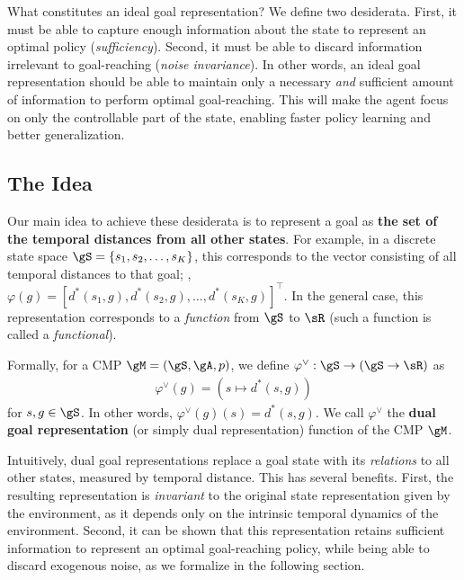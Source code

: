 \documentclass[final]{article} %
\theoremstyle{plain}
\theoremstyle{definition}
\theoremstyle{remark}
\renewcommand{\phi}{\varphi}
\newcommand{\cutsubsectionup}{\vspace{-2pt}}
\newcommand{\cutsubsectiondown}{\vspace{-3pt}}
\begin{document}
What constitutes an ideal goal representation?
We define two desiderata.
First, it must be able to capture enough information about the state to represent an optimal policy (\emph{sufficiency}).
Second, it must be able to discard information irrelevant to goal-reaching (\emph{noise invariance}).
In other words,
an ideal goal representation should be able to maintain
only a necessary \emph{and} sufficient amount of information to perform optimal goal-reaching.
This will make the agent focus on only the controllable part of the state,
enabling faster policy learning and better generalization.

%

\cutsubsectionup
\subsection{The Idea}
\cutsubsectiondown

Our main idea to achieve these desiderata is
to represent a goal as \textbf{the set of the temporal distances from all other states}.
For example, in a discrete state space $\gS = \{s_1, s_2, \ldots, s_K\}$, this corresponds to
the vector consisting of all temporal distances to that goal; \ie, $\phi(g) = [d^*(s_1, g), d^*(s_2, g), \ldots, d^*(s_K, g)]^\top$.
In the general case, this representation corresponds to a \emph{function} from $\gS$ to $\sR$
(such a function is called a \emph{functional}).

Formally, for a CMP $\gM = (\gS, \gA, p)$,
we define $\phi^\vee: \gS \to (\gS \to \sR)$ as
\begin{align*}
    \phi^\vee(g) = (s \mapsto d^*(s, g))
\end{align*}
for $s, g \in \gS$.
In other words, $\phi^\vee(g)(s) = d^*(s, g)$.
We call $\phi^\vee$ the \textbf{dual goal representation} (or simply dual representation) function of the CMP $\gM$.

Intuitively, dual goal representations replace
a goal state with its \emph{relations} to all other states, measured by temporal distance.
This has several benefits.
First, the resulting representation is \emph{invariant} to the original state representation given by the environment,
as it depends only on the intrinsic temporal dynamics of the environment.
Second, it can be shown that this representation retains sufficient information to represent an optimal goal-reaching policy,
while being able to discard exogenous noise,
as we formalize in the following section.
\end{document}

